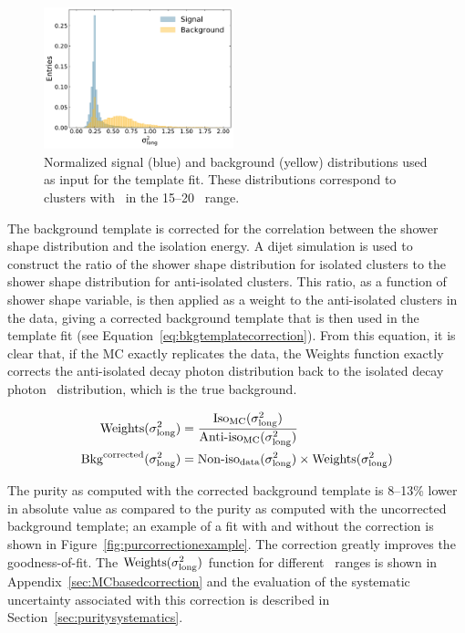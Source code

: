 \begin{figure}
\center
\includegraphics[width=0.49\textwidth]{Purity/norm-templates-p-Pb-cluster_Lambda-15-20.pdf}
\caption{Normalized signal (blue) and background (yellow) distributions used as input for the template fit. These distributions correspond to clusters with \pt~in the 15--20 \GeVc~range.}
\label{TemplateShapes}
\end{figure}

The background template is corrected for the correlation between the shower shape distribution and the isolation energy. A dijet simulation is used to construct the ratio of the shower shape distribution for isolated clusters to the shower shape distribution for anti-isolated clusters. This ratio, as a function of shower shape variable, is then applied as a weight to the anti-isolated clusters in the data, giving a corrected background template that is then used in the template fit (see Equation~\ref{eq:bkgtemplatecorrection}). From this equation, it is clear that, if the MC exactly replicates the data, the Weights function exactly corrects the anti-isolated decay photon \lambdasquare distribution back to the isolated decay photon \lambdasquare~distribution, which is the true background. 

\begin{align}
    \text{Weights}(\sigma^{2}_{\mathrm{long}})&=\frac{\text{Iso}_{\text{MC}}(\sigma^{2}_{\mathrm{long}})}{\text{Anti-iso}_{\text{MC}}(\sigma^{2}_{\mathrm{long}})} \nonumber \\
    \text{Bkg}^{\text{corrected}}(\sigma^{2}_{\mathrm{long}})&=\text{Non-iso}_{\text{data}}(\sigma^{2}_{\mathrm{long}})\times\text{Weights}(\sigma^{2}_{\mathrm{long}})
    \label{eq:bkgtemplatecorrection}
\end{align}

The purity as computed with the corrected background template is 8--13\% lower in absolute value as compared to the purity as computed with the uncorrected background template; an example of a fit with and without the correction is shown in Figure~\ref{fig:purcorrectionexample}. The correction greatly improves the goodness-of-fit. The $\text{Weights}(\sigma^{2}_{\mathrm{long}})$ function for different \pt~ranges is shown in Appendix~\ref{sec:MCbasedcorrection} and the evaluation of the systematic uncertainty associated with this correction is described in Section~\ref{sec:puritysystematics}. 

